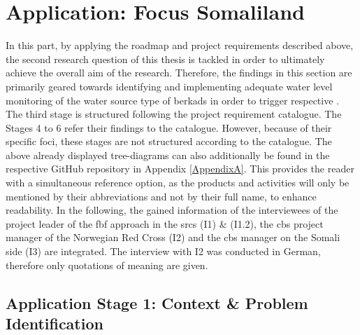 \pagebreak


\section{Application: Focus Somaliland}\label{sec:f_a}

In this part, by applying the roadmap and project requirements described above, the second research question of this thesis is tackled in order to ultimately achieve the overall aim of the research. Therefore, the findings in this section are primarily geared towards identifying and implementing adequate water level monitoring of the water source type of berkads in order to trigger respective . The third stage is structured following the project requirement catalogue. The Stages 4 to 6 refer their findings to the catalogue. However, because of their specific foci, these stages are not structured according to the catalogue. The above already displayed tree-diagrams can also additionally be found in the respective GitHub repository in Appendix \ref{AppendixA}. This provides the reader with a simultaneous reference option, as the products and activities will only be mentioned by their abbreviations and not by their full name, to enhance readability. In the following, the gained information of the interviewees of the project leader of the \acrshort{fbf} approach in the \acrshort{srcs} (I1) \& (I1.2), the \acrshort{cbs} project manager of the Norwegian Red Cross (I2) and the \acrshort{cbs} manager on the Somali side (I3) are integrated. The interview with I2 was conducted in German, therefore only quotations of meaning are given.

\subsection{Application Stage 1: Context \& Problem Identification}\label{subsec:stage1_appl}

